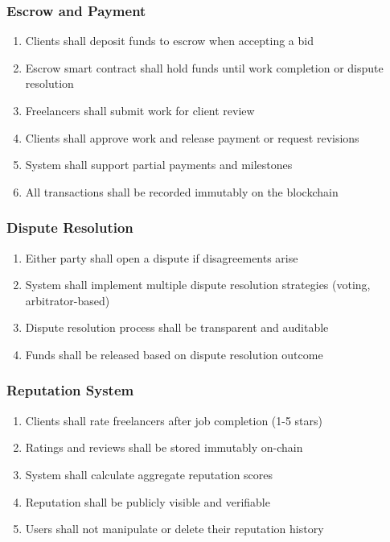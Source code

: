 \documentclass[a4paper,13pt,twoside]{report}
\theoremstyle{definition}
\begin{document}
\subsubsection{Escrow and Payment}

\begin{enumerate}
    \item Clients shall deposit funds to escrow when accepting a bid
    \item Escrow smart contract shall hold funds until work completion or dispute resolution
    \item Freelancers shall submit work for client review
    \item Clients shall approve work and release payment or request revisions
    \item System shall support partial payments and milestones
    \item All transactions shall be recorded immutably on the blockchain
\end{enumerate}

\subsubsection{Dispute Resolution}

\begin{enumerate}
    \item Either party shall open a dispute if disagreements arise
    \item System shall implement multiple dispute resolution strategies (voting, arbitrator-based)
    \item Dispute resolution process shall be transparent and auditable
    \item Funds shall be released based on dispute resolution outcome
\end{enumerate}

\subsubsection{Reputation System}

\begin{enumerate}
    \item Clients shall rate freelancers after job completion (1-5 stars)
    \item Ratings and reviews shall be stored immutably on-chain
    \item System shall calculate aggregate reputation scores
    \item Reputation shall be publicly visible and verifiable
    \item Users shall not manipulate or delete their reputation history
\end{enumerate}
\end{document}
